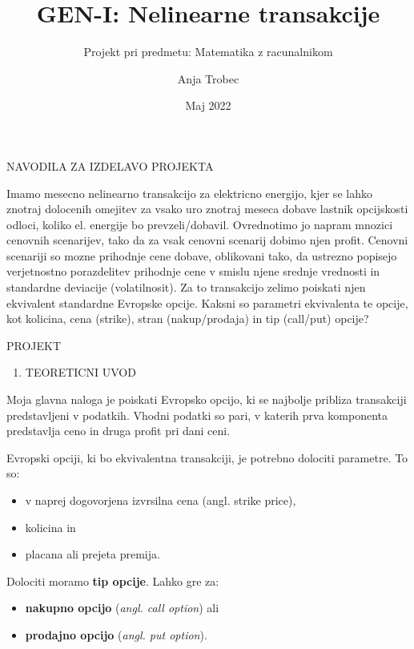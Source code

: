 \documentclass[
]{article}
\title{GEN-I: Nelinearne transakcije}
\subtitle{Projekt pri predmetu: Matematika z racunalnikom}
\author{Anja Trobec}
\date{Maj 2022}
\providecommand{\tightlist}{%
  \setlength{\itemsep}{0pt}\setlength{\parskip}{0pt}}
\begin{document}
\maketitle

{
\setcounter{tocdepth}{2}
\tableofcontents
}
NAVODILA ZA IZDELAVO PROJEKTA

Imamo mesecno nelinearno transakcijo za elektricno energijo, kjer se
lahko znotraj dolocenih omejitev za vsako uro znotraj meseca dobave
lastnik opcijskosti odloci, koliko el. energije bo prevzeli/dobavil.
Ovrednotimo jo napram mnozici cenovnih scenarijev, tako da za vsak
cenovni scenarij dobimo njen profit. Cenovni scenariji so mozne
prihodnje cene dobave, oblikovani tako, da ustrezno popisejo
verjetnostno porazdelitev prihodnje cene v smislu njene srednje
vrednosti in standardne deviacije (volatilnosit). Za to transakcijo
zelimo poiskati njen ekvivalent standardne Evropske opcije. Kaksni so
parametri ekvivalenta te opcije, kot kolicina, cena (strike), stran
(nakup/prodaja) in tip (call/put) opcije?

PROJEKT

\begin{enumerate}
\def\labelenumi{\arabic{enumi}.}
\tightlist
\item
  TEORETICNI UVOD
\end{enumerate}

Moja glavna naloga je poiskati Evropsko opcijo, ki se najbolje pribliza
transakciji predstavljeni v podatkih. Vhodni podatki so pari, v katerih
prva komponenta predstavlja ceno in druga profit pri dani ceni.

Evropski opciji, ki bo ekvivalentna transakciji, je potrebno dolociti
parametre. To so:

\begin{itemize}
\tightlist
\item
  v naprej dogovorjena izvrsilna cena (angl. strike price),
\item
  kolicina in
\item
  placana ali prejeta premija.
\end{itemize}

Dolociti moramo \textbf{tip opcije}. Lahko gre za:

\begin{itemize}
\tightlist
\item
  \textbf{nakupno opcijo} (\emph{angl. call option}) ali
\item
  \textbf{prodajno opcijo} (\emph{angl. put option}).
\end{itemize}
\end{document}
